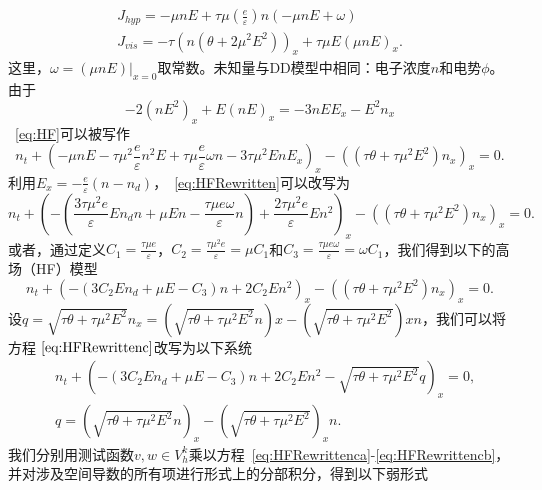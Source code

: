 $$
    \begin{gathered}
        J_{h y p}=-\mu n E+\tau \mu\left(\frac{e}{\varepsilon}\right) n(-\mu n E+\omega) \\
        J_{v i s}=-\tau\left(n\left(\theta+2 \mu^{2} E^{2}\right)\right)_{x}+\tau \mu E(\mu n E)_{x} .
    \end{gathered}
$$
这里，$\omega=\left.(\mu n E)\right|_{x=0}$取常数。未知量与DD模型中相同：电子浓度$n$和电势$\phi$。由于
$$
    -2\left(n E^{2}\right)_{x}+E(n E)_{x}=-3 n E E_{x}-E^{2} n_{x}
$$
~\eqref{eq:HF}可以被写作
\begin{equation}
    n_{t}+\left(-\mu n E-\tau \mu^{2} \frac{e}{\varepsilon} n^{2} E+\tau \mu \frac{e}{\varepsilon} \omega n-3 \tau \mu^{2} E n E_{x}\right)_{x}-\left(\left(\tau \theta+\tau \mu^{2} E^{2}\right) n_{x}\right)_{x}=0.\label{eq:HFRewritten}
\end{equation}
利用$E_{x}=-\frac{e}{\varepsilon}\left(n-n_{d}\right)$，~\eqref{eq:HFRewritten}可以改写为
\begin{equation}
    n_{t}+\left(-\left(\frac{3 \tau \mu^{2} e}{\varepsilon} E n_{d} n+\mu E n-\frac{\tau \mu e \omega}{\varepsilon} n\right)+\frac{2 \tau \mu^{2} e}{\varepsilon} E n^{2}\right)_{x}-\left(\left(\tau \theta+\tau \mu^{2} E^{2}\right) n_{x}\right)_{x}=0 . \label{eq:HFRewrittenb}
\end{equation}
或者，通过定义$C_{1}=\frac{\tau \mu e}{\varepsilon}$，$C_{2}=\frac{\tau \mu^{2} e}{\varepsilon}=\mu C_{1}$和$C_{3}=\frac{\tau \mu e \omega}{\varepsilon}=\omega C_{1}$，我们得到以下的高场（HF）模型
\begin{equation}
    n_{t}+\left(-\left(3 C_{2} E n_{d}+\mu E-C_{3}\right) n+2 C_{2} E n^{2}\right)_{x}-\left(\left(\tau \theta+\tau \mu^{2} E^{2}\right) n_{x}\right)_{x}=0 .  \label{eq:HFRewrittenc}
\end{equation}
设$q=\sqrt{\tau \theta+\tau \mu^{2} E^{2}} n_{x}=\left(\sqrt{\tau \theta+\tau \mu^{2} E^{2}} n\right){x}-\left(\sqrt{\tau \theta+\tau \mu^{2} E^{2}}\right){x} n$，我们可以将方程$~\eqref{eq:HFRewrittenc}$改写为以下系统
\begin{align}
     & n_{t}+\left(-\left(3 C_{2} E n_{d}+\mu E-C_{3}\right) n+2 C_{2} E n^{2}-\sqrt{\tau \theta+\tau \mu^{2} E^{2}} q\right)_{x}=0, \label{eq:HFRewrittenca} \\
     & q=\left(\sqrt{\tau \theta+\tau \mu^{2} E^{2}} n\right)_{x}-\left(\sqrt{\tau \theta+\tau \mu^{2} E^{2}}\right)_{x} n.\label{eq:HFRewrittencb}
\end{align}
我们分别用测试函数$v, w \in V_{h}^{k}$乘以方程~\eqref{eq:HFRewrittenca}-\eqref{eq:HFRewrittencb}，并对涉及空间导数的所有项进行形式上的分部积分，得到以下弱形式
